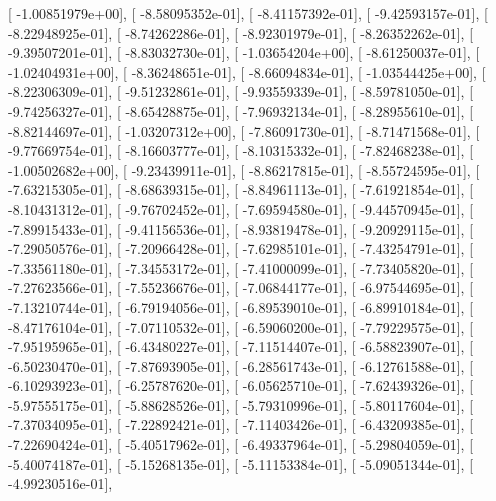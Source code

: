\documentclass{article}
\begin{document}
       [ -1.00851979e+00],
       [ -8.58095352e-01],
       [ -8.41157392e-01],
       [ -9.42593157e-01],
       [ -8.22948925e-01],
       [ -8.74262286e-01],
       [ -8.92301979e-01],
       [ -8.26352262e-01],
       [ -9.39507201e-01],
       [ -8.83032730e-01],
       [ -1.03654204e+00],
       [ -8.61250037e-01],
       [ -1.02404931e+00],
       [ -8.36248651e-01],
       [ -8.66094834e-01],
       [ -1.03544425e+00],
       [ -8.22306309e-01],
       [ -9.51232861e-01],
       [ -9.93559339e-01],
       [ -8.59781050e-01],
       [ -9.74256327e-01],
       [ -8.65428875e-01],
       [ -7.96932134e-01],
       [ -8.28955610e-01],
       [ -8.82144697e-01],
       [ -1.03207312e+00],
       [ -7.86091730e-01],
       [ -8.71471568e-01],
       [ -9.77669754e-01],
       [ -8.16603777e-01],
       [ -8.10315332e-01],
       [ -7.82468238e-01],
       [ -1.00502682e+00],
       [ -9.23439911e-01],
       [ -8.86217815e-01],
       [ -8.55724595e-01],
       [ -7.63215305e-01],
       [ -8.68639315e-01],
       [ -8.84961113e-01],
       [ -7.61921854e-01],
       [ -8.10431312e-01],
       [ -9.76702452e-01],
       [ -7.69594580e-01],
       [ -9.44570945e-01],
       [ -7.89915433e-01],
       [ -9.41156536e-01],
       [ -8.93819478e-01],
       [ -9.20929115e-01],
       [ -7.29050576e-01],
       [ -7.20966428e-01],
       [ -7.62985101e-01],
       [ -7.43254791e-01],
       [ -7.33561180e-01],
       [ -7.34553172e-01],
       [ -7.41000099e-01],
       [ -7.73405820e-01],
       [ -7.27623566e-01],
       [ -7.55236676e-01],
       [ -7.06844177e-01],
       [ -6.97544695e-01],
       [ -7.13210744e-01],
       [ -6.79194056e-01],
       [ -6.89539010e-01],
       [ -6.89910184e-01],
       [ -8.47176104e-01],
       [ -7.07110532e-01],
       [ -6.59060200e-01],
       [ -7.79229575e-01],
       [ -7.95195965e-01],
       [ -6.43480227e-01],
       [ -7.11514407e-01],
       [ -6.58823907e-01],
       [ -6.50230470e-01],
       [ -7.87693905e-01],
       [ -6.28561743e-01],
       [ -6.12761588e-01],
       [ -6.10293923e-01],
       [ -6.25787620e-01],
       [ -6.05625710e-01],
       [ -7.62439326e-01],
       [ -5.97555175e-01],
       [ -5.88628526e-01],
       [ -5.79310996e-01],
       [ -5.80117604e-01],
       [ -7.37034095e-01],
       [ -7.22892421e-01],
       [ -7.11403426e-01],
       [ -6.43209385e-01],
       [ -7.22690424e-01],
       [ -5.40517962e-01],
       [ -6.49337964e-01],
       [ -5.29804059e-01],
       [ -5.40074187e-01],
       [ -5.15268135e-01],
       [ -5.11153384e-01],
       [ -5.09051344e-01],
       [ -4.99230516e-01],
\end{document}
